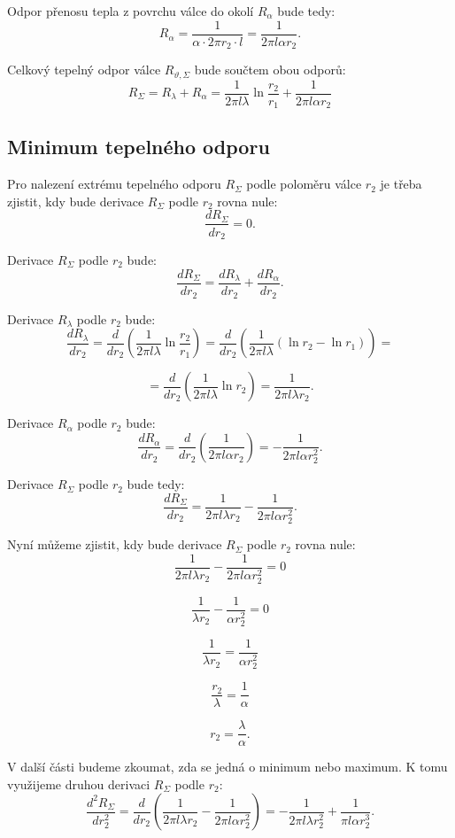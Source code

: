 \documentclass{article}
\begin{document}
Odpor přenosu tepla z povrchu válce do okolí $R_\alpha$ bude tedy:
$$
    R_\alpha = \frac{1}{\alpha \cdot 2 \pi r_2 \cdot l} = \frac{1}{2 \pi l \alpha r_2}.
$$

Celkový tepelný odpor válce $R_{\vartheta, \Sigma}$ bude součtem obou odporů:
$$
    R_\Sigma = R_\lambda + R_\alpha = \frac{1}{2 \pi l \lambda} \ln \frac{r_2}{r_1} + \frac{1}{2 \pi l \alpha r_2}
$$


\subsection{Minimum tepelného odporu}

Pro nalezení extrému tepelného odporu $R_\Sigma$ podle poloměru válce $r_2$ je třeba zjistit, kdy bude derivace $R_\Sigma$ podle $r_2$ rovna nule:
$$
    \frac{dR_\Sigma}{dr_2} = 0.
$$

Derivace $R_\Sigma$ podle $r_2$ bude:
$$
    \frac{dR_\Sigma}{dr_2} = \frac{dR_\lambda}{dr_2} + \frac{dR_\alpha}{dr_2}.
$$

Derivace $R_\lambda$ podle $r_2$ bude:
$$
    \frac{dR_\lambda}{dr_2} = \frac{d}{dr_2} \left( \frac{1}{2 \pi l \lambda} \ln \frac{r_2}{r_1} \right) = \frac{d}{dr_2} \left( \frac{1}{2 \pi l \lambda} \left(\ln r_2 - \ln r_1 \right) \right) =
$$

$$
    = \frac{d}{dr_2} \left( \frac{1}{2 \pi l \lambda} \ln r_2 \right) = \frac{1}{2 \pi l \lambda r_2}.
$$

Derivace $R_\alpha$ podle $r_2$ bude:
$$
    \frac{dR_\alpha}{dr_2} = \frac{d}{dr_2} \left( \frac{1}{2 \pi l \alpha r_2} \right) = -\frac{1}{2 \pi l \alpha r_2^2}.
$$

Derivace $R_\Sigma$ podle $r_2$ bude tedy:
$$
    \frac{dR_\Sigma}{dr_2} = \frac{1}{2 \pi l \lambda r_2} - \frac{1}{2 \pi l \alpha r_2^2}.
$$

Nyní můžeme zjistit, kdy bude derivace $R_\Sigma$ podle $r_2$ rovna nule:
$$
    \frac{1}{2 \pi l \lambda r_2} - \frac{1}{2 \pi l \alpha r_2^2} = 0
$$

$$
    \frac{1}{\lambda r_2} - \frac{1}{\alpha r_2^2} = 0
$$

$$
    \frac{1}{\lambda r_2} = \frac{1}{\alpha r_2^2}
$$

$$
    \frac{r_2}{\lambda} = \frac{1}{\alpha}
$$

$$
    r_2 = \frac{\lambda}{\alpha}.
$$

V další části budeme zkoumat, zda se jedná o minimum nebo maximum. K tomu využijeme druhou derivaci $R_\Sigma$ podle $r_2$:
$$
    \frac{d^2R_\Sigma}{dr_2^2} = \frac{d}{dr_2} \left( \frac{1}{2 \pi l \lambda r_2} - \frac{1}{2 \pi l \alpha r_2^2} \right) = -\frac{1}{2 \pi l \lambda r_2^2} + \frac{1}{\pi l \alpha r_2^3}.
$$
\end{document}
